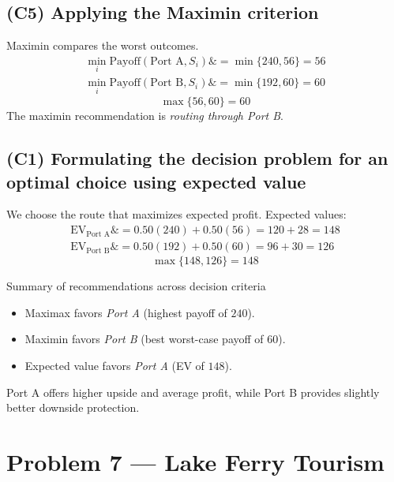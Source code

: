 \documentclass[11pt]{article}
\begin{document}
	\subsection*{(C5) Applying the Maximin criterion}
	
	\hypertarget{problem6-c5}{}
	
	Maximin compares the worst outcomes.
	\[
	\begin{aligned}
		\min_i \text{Payoff}(\text{Port A}, S_i) \&= \min\{240, 56\} = 56 \\
		\min_i \text{Payoff}(\text{Port B}, S_i) \&= \min\{192, 60\} = 60
	\end{aligned}
	\]
	\[
	\max\{56, 60\} = 60
	\]
	The maximin recommendation is \emph{routing through Port B}.
	
	\subsection*{(C1) Formulating the decision problem for an optimal choice using expected value}
	
	\hypertarget{problem6-c1}{}
	
	We choose the route that maximizes expected profit. Expected values:
	\[
	\begin{aligned}
		\mathrm{EV}_{\text{Port A}} \&= 0.50(240) + 0.50(56) = 120 + 28 = 148 \\
		\mathrm{EV}_{\text{Port B}} \&= 0.50(192) + 0.50(60) = 96 + 30 = 126
	\end{aligned}
	\]
	\[
	\max\{148, 126\} = 148
	\]
	
	Summary of recommendations across decision criteria
	\begin{itemize}
		\item Maximax favors \emph{Port A} (highest payoff of $240$).
		\item Maximin favors \emph{Port B} (best worst-case payoff of $60$).
		\item Expected value favors \emph{Port A} (EV of $148$).
	\end{itemize}
	
	Port A offers higher upside and average profit, while Port B provides slightly better downside protection.
	
	\section*{Problem 7 — Lake Ferry Tourism}
	
	\hypertarget{problem7}{}
	
	\hypertarget{problem7-criteria}{}
	
\end{document}
